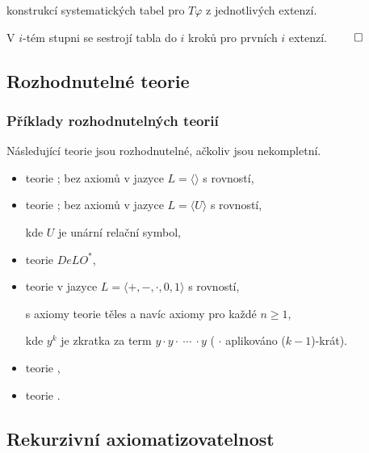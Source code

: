      konstrukcí systematických tabel pro $T\varphi$ z jednotlivých extenzí.
    \smallskip
    
    V $i$-tém stupni se sestrojí tabla do $i$ kroků pro prvních $i$ extenzí. $\qed$
    

\subsection{Rozhodnutelné teorie}\todo

\subsubsection*{Příklady rozhodnutelných teorií}
Následující teorie jsou rozhodnutelné, ačkoliv jsou nekompletní.
\smallskip

\begin{itemize}
\item teorie ; bez axiomů v jazyce $L=\langle \rangle$ s rovností,
\smallskip

\item teorie ; bez axiomů v jazyce $L=\langle U \rangle$ s rovností,
\smallskip

kde $U$ je unární relační symbol,
\smallskip

\item teorie  $DeLO^*$,
\smallskip

\item teorie  v jazyce $L=\langle +,-,\cdot,0,1\rangle$ s rovností,
\smallskip

s axiomy teorie těles a navíc axiomy pro každé $n\ge 1$,



kde $y^k$ je zkratka za term $y\cdot y \cdot\ \dotsb\ \cdot y$ ( $\cdot$ aplikováno ($k-1$)-krát).
\smallskip

\item teorie ,
\smallskip

\item teorie .
\end{itemize}


\subsection{Rekurzivní axiomatizovatelnost}\todo


